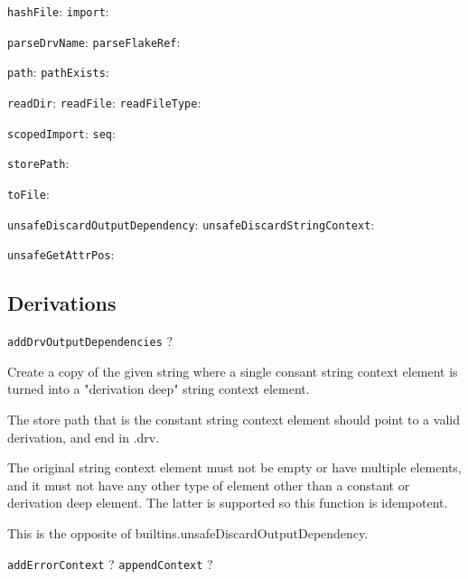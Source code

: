 \documentclass[9pt, a4paper, landscape]{extarticle}
\newcommand{\cmd}[1]{\texttt{#1}}
\begin{document}
\begin{multicols*}{3}
\cmd{hashFile}:
\cmd{import}:

\cmd{parseDrvName}:
\cmd{parseFlakeRef}:


\cmd{path}:
\cmd{pathExists}:

\cmd{readDir}:
\cmd{readFile}:
\cmd{readFileType}:

\cmd{scopedImport}:
\cmd{seq}:



\cmd{storePath}:

\cmd{toFile}:



\cmd{unsafeDiscardOutputDependency}:
\cmd{unsafeDiscardStringContext}:

\cmd{unsafeGetAttrPos}:


\subsection*{Derivations}

  \cmd{addDrvOutputDependencies} ?

    Create a copy of the given string where a single consant string context element is turned into a "derivation deep" string context element.

    The store path that is the constant string context element should point to a valid derivation, and end in .drv.

    The original string context element must not be empty or have multiple elements, and it must not have any other type of element other than a constant or derivation deep element. The latter is supported so this function is idempotent.

    This is the opposite of builtins.unsafeDiscardOutputDependency.
  
\cmd{addErrorContext} ?
\cmd{appendContext} ?


\end{multicols*}
\end{document}
